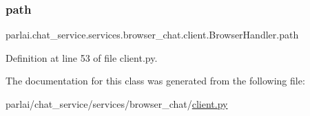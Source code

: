 \subsubsection{\texorpdfstring{path}{path}}
{\footnotesize\ttfamily parlai.\+chat\+\_\+service.\+services.\+browser\+\_\+chat.\+client.\+Browser\+Handler.\+path}



Definition at line 53 of file client.\+py.



The documentation for this class was generated from the following file\+:\begin{DoxyCompactItemize}
\item 
parlai/chat\+\_\+service/services/browser\+\_\+chat/\hyperlink{browser__chat_2client_8py}{client.\+py}\end{DoxyCompactItemize}
